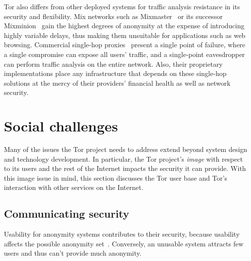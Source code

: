 \documentclass{llncs}
\begin{document}
Tor also differs from other deployed systems for traffic analysis resistance
in its security and flexibility.  Mix networks such as
Mixmaster~\cite{mixmaster-spec} or its successor Mixminion~\cite{minion-design}
gain the highest degrees of anonymity at the expense of introducing highly
variable delays, thus making them unsuitable for applications such as web
browsing.  Commercial single-hop
proxies~\cite{anonymizer} present a single point of failure, where
a single compromise can expose all users' traffic, and a single-point
eavesdropper can perform traffic analysis on the entire network.
Also, their proprietary implementations place any infrastructure that
depends on these single-hop solutions at the mercy of their providers'
financial health as well as network security.



\section{Social challenges}

Many of the issues the Tor project needs to address extend beyond
system design and technology development. In particular, the
Tor project's \emph{image} with respect to its users and the rest of
the Internet impacts the security it can provide.
With this image issue in mind, this section discusses the Tor user base and
Tor's interaction with other services on the Internet.

\subsection{Communicating security}

Usability for anonymity systems
contributes to their security, because usability
affects the possible anonymity set~\cite{econymics,back01}.
Conversely, an unusable system attracts few users and thus can't provide
much anonymity.
\end{document}
